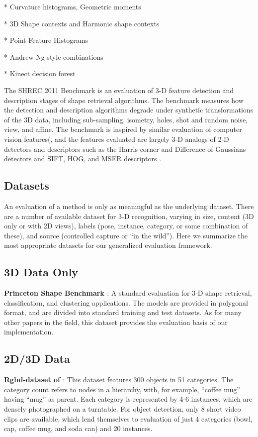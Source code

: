* Curvature histograms, Geometric moments

* 3D Shape contexts and Harmonic shape contexts \cite{Frome2004}

* Point Feature Histograms \cite{Rusu2009}

* Andrew Ng-style combinations \cite{Gould2008,Coates2010}

* Kinect decision forest \cite{Shotton2011}

The SHREC 2011 Benchmark \cite{Boyer2011} is an evaluation of 3-D feature detection and description stages of shape retrieval algorithms.
The benchmark measures how the detection and description algorithms degrade under synthetic transformations of the 3D data, including sub-sampling, isometry, holes, shot and random noise, view, and affine.
The benchmark is inspired by similar evaluation of computer vision features(\cite{Mikolajczyk2004,Mikolajczyk2005}, and the features evaluated are largely 3-D analogs of 2-D detectors and descriptors such as the Harris corner and Difference-of-Gaussians \cite{Harris1988,Lowe2004} detectors and SIFT, HOG, and MSER descriptors \cite{Lowe2004,Dalal2005,Matas2004}.

\subsection{Datasets}

An evaluation of a method is only as meaningful as the underlying dataset.
There are a number of available dataset for 3-D recognition, varying in size, content (3D only or with 2D views), labels (pose, instance, category, or some combination of these), and source (controlled capture or ``in the wild'').
Here we summarize the most appropriate datasets for our generalized evaluation framework.

\subsection{3D Data Only}
{\bf Princeton Shape Benchmark \cite{Shilane2004}}:
A standard evaluation for 3-D shape retrieval, classification, and clustering applications.
The models are provided in polygonal format, and are divided into standard training and test datasets.
As for many other papers in the field, this dataset provides the evaluation basis of our implementation.

\subsection{2D/3D Data}
{\bf Rgbd-dataset of \cite{Lai2011}}:
This dataset features 300 objects in 51 categories.
The category count refers to nodes in a hierarchy, with, for example, ``coffee mug'' having ``mug'' as parent.
Each category is represented by 4-6 instances, which are densely photographed on a turntable.
For object detection, only 8 short video clips are available, which lend themselves to evaluation of just 4 categories (bowl, cap, coffee mug, and soda can) and 20 instances.


